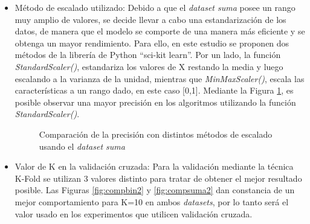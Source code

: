 \begin{itemize}
    \item Método de escalado utilizado: Debido a que el \textit{dataset suma} posee un rango muy amplio de valores, se decide llevar a cabo una estandarización de los datos, de manera que el modelo se comporte de una manera más eficiente y se obtenga un mayor rendimiento. Para ello, en este estudio se proponen dos métodos de la librería de Python ``sci-kit learn''. Por un lado, la función \textit{StandardScaler()}, estandariza los valores de X restando la media y luego escalando a la varianza de la unidad, mientras que \textit{MinMaxScaler()}, escala las características a un rango dado, en este caso [0,1]. Mediante la Figura \ref{fig:compsuma3}, es posible observar una mayor precisión en los algoritmos utilizando la función \textit{StandardScaler()}. 
    
    \begin{figure}[h!]
    \begin{center}
    {}
    \end{center}
    \caption{Comparación de la precisión con distintos métodos de escalado usando el \textit{dataset suma}}
    \label{fig:compsuma3}
    \end{figure}
    
    \item Valor de K en la validación cruzada: Para la validación mediante la técnica K-Fold se utilizan 3 valores distinto para tratar de obtener el mejor resultado posible. Las Figuras \ref{fig:compbin2} y \ref{fig:compsuma2} dan constancia de un mejor comportamiento para K=10 en ambos \textit{datasets}, por lo tanto será el valor usado en los experimentos que utilicen validación cruzada.
    

\end{itemize}
